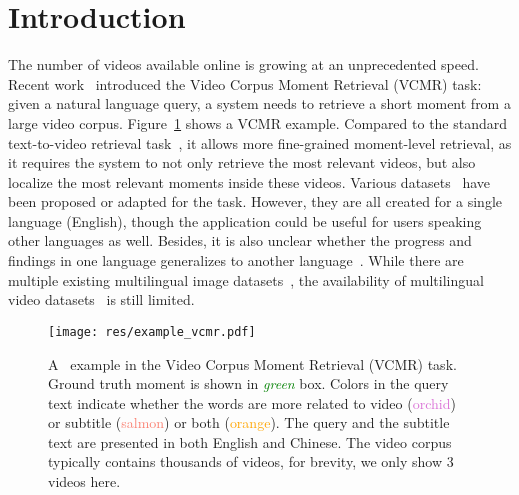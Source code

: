 \section{Introduction}\label{introuction}
The number of videos available online is growing at an unprecedented speed.
Recent work~\cite{escorcia2019temporal,lei2020tvr} introduced the Video Corpus Moment Retrieval (VCMR) task: given a natural language query, a system needs to retrieve a short moment from a large video corpus. 
Figure~\ref{fig:data_example} shows a VCMR example.
Compared to the standard text-to-video retrieval task~\cite{xu2016msr,yu2018joint}, it allows more fine-grained moment-level retrieval, as it requires the system to not only retrieve the most relevant videos, but also localize the most relevant moments inside these videos. 
Various datasets~\cite{Krishna2017DenseCaptioningEI,anne2017localizing,gao2017tall,lei2020tvr} have been proposed or adapted for the task. 
However, they are all created for a single language (English), though the application could be useful for users speaking other languages as well. 
Besides, it is also unclear whether the progress and findings in one language generalizes to another language~\cite{bender2009linguistically}.
While there are multiple existing multilingual image datasets~\cite{gao2015you,elliott-etal-2016-multi30k,shimizu2018visual,pappas2016multilingual,lan2017fluency,li2019coco}, the availability of multilingual video datasets~\cite{Wang_2019_ICCV,chen2011collecting} is still limited.


\begin{figure}[!t]
\begin{center}
  \texttt{[image: res/example\_vcmr.pdf]}
  \vspace{-12pt}
  \caption{
  A \DsetName~example in the Video Corpus Moment Retrieval (VCMR) task. Ground truth moment is shown in \textit{\textcolor{green}{green}} box. Colors in the query text indicate whether the words are more related to video (\textcolor{orchid}{orchid}) or  subtitle (\textcolor{salmon}{salmon}) or both (\textcolor{orange}{orange}). 
  The query and the subtitle text are presented in both English and Chinese. 
  The video corpus typically contains thousands of videos, for brevity, we only show 3 videos here.
  }
  \label{fig:data_example}
  \end{center}
\end{figure}


